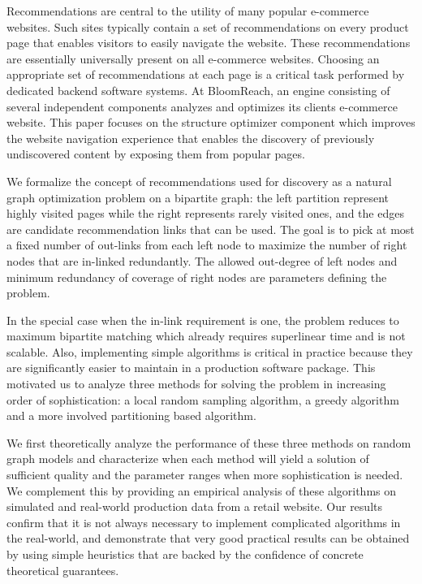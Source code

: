 \abstract


Recommendations are central to the utility of many popular e-commerce
websites. Such sites typically contain a set of recommendations on
every product page that enables visitors to easily
navigate the website.  These recommendations are essentially universally present
on all e-commerce websites. Choosing an appropriate set of recommendations
at each page is a critical task performed by dedicated backend
software systems.  At BloomReach, an engine consisting of several independent components
analyzes and optimizes its clients e-commerce website. This paper
focuses on the structure optimizer component which improves the
website navigation experience that enables the discovery of previously
undiscovered content by exposing them from popular pages.\vs


We formalize the concept of recommendations used for discovery as a natural graph optimization
problem on a bipartite graph: the left partition represent highly visited pages while the right 
represents rarely visited ones, and the edges are candidate recommendation links that can be used. 
The goal is to pick at most a fixed number of out-links from each left node to maximize the number of 
right nodes that are in-linked redundantly. The allowed out-degree of left nodes and minimum redundancy
 of coverage of right nodes are parameters defining the problem.

In the special case when the in-link requirement is one, the problem reduces to maximum bipartite 
matching which already requires superlinear time and is not scalable. Also, implementing simple
algorithms is critical in practice because they are significantly
easier to maintain in a production software package. This motivated us
to analyze three methods for solving the problem in increasing order
of sophistication: a local random sampling algorithm, a greedy algorithm
and a more involved partitioning based algorithm. \vs

We first theoretically analyze the performance of these three methods
on random graph models and characterize when each method will yield a
solution of sufficient quality and the parameter ranges when more
sophistication is needed. We complement this by providing an empirical
analysis of these algorithms on simulated and real-world production
data from a retail website. Our results confirm that it is not always necessary to implement  complicated algorithms in the real-world, and
demonstrate that very good practical results can be obtained by
using simple heuristics that are backed by the confidence of concrete
theoretical guarantees. \vs

